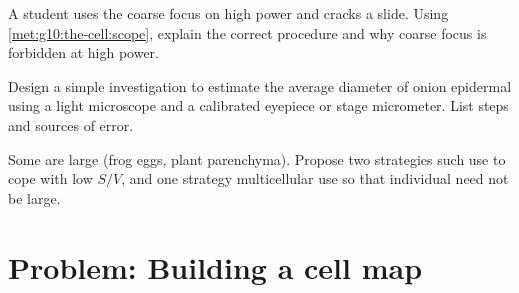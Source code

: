 \begin{exercise}[$\star\star$]\label{exo:g10:the-cell:9}
A student uses the coarse focus on high power and cracks a slide. Using
\cref{met:g10:the-cell:scope}, explain the correct procedure and why
coarse focus is forbidden at high power.
\end{exercise}

\begin{exercise}[$\star\star\star$]\label{exo:g10:the-cell:10}
Design a simple investigation to estimate the average diameter of onion
epidermal  using a light microscope and a calibrated eyepiece or
stage micrometer. List steps and sources of error.
\end{exercise}

\begin{exercise}[$\star\star\star$]\label{exo:g10:the-cell:11}
Some  are large (frog eggs, plant parenchyma). Propose two
strategies such  use to cope with low $S/V$, and one strategy
multicellular  use so that individual  need not be large.
\end{exercise}

\section{Problem: Building a cell map}

